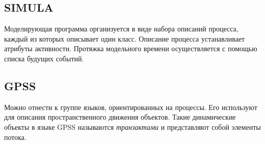 \subsection{SIMULA}

Моделирующая программа организуется в виде набора описаний процесса, каждый из которых описывает один класс. Описание процесса устанавливает атрибуты активности. Протяжка модельного времени осуществляется с помощью списка будущих событий.

\subsection{GPSS}

Можно отнести к группе языков, ориентированных на процессы. Его используют для описания пространственного движения объектов. Такие динамические объекты в языке GPSS называются \textit{транзактами} и представляют собой элементы потока.

